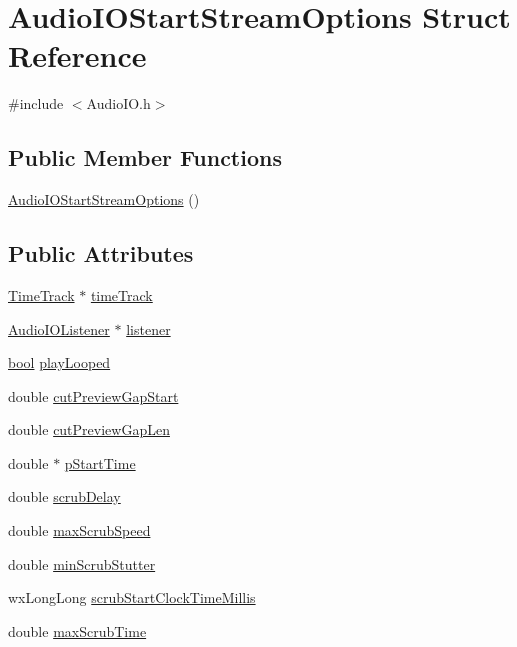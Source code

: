 \hypertarget{struct_audio_i_o_start_stream_options}{}\section{Audio\+I\+O\+Start\+Stream\+Options Struct Reference}
\label{struct_audio_i_o_start_stream_options}


{\ttfamily \#include $<$Audio\+I\+O.\+h$>$}

\subsection*{Public Member Functions}
\begin{DoxyCompactItemize}
\item 
\hyperlink{struct_audio_i_o_start_stream_options_a033ef570923e73da96f6e11c7f1b8647}{Audio\+I\+O\+Start\+Stream\+Options} ()
\end{DoxyCompactItemize}
\subsection*{Public Attributes}
\begin{DoxyCompactItemize}
\item 
\hyperlink{class_time_track}{Time\+Track} $\ast$ \hyperlink{struct_audio_i_o_start_stream_options_a3516f7c72546aa8a73fb25b2e628170f}{time\+Track}
\item 
\hyperlink{class_audio_i_o_listener}{Audio\+I\+O\+Listener} $\ast$ \hyperlink{struct_audio_i_o_start_stream_options_a326a9c07ece9c6b6ad8be00acc504dac}{listener}
\item 
\hyperlink{mac_2config_2i386_2lib-src_2libsoxr_2soxr-config_8h_abb452686968e48b67397da5f97445f5b}{bool} \hyperlink{struct_audio_i_o_start_stream_options_a51e6ebc52db021a9c18cdfa1e70c5ace}{play\+Looped}
\item 
double \hyperlink{struct_audio_i_o_start_stream_options_ae0b3e06a7234158e7f213302b71df8cb}{cut\+Preview\+Gap\+Start}
\item 
double \hyperlink{struct_audio_i_o_start_stream_options_a3a56b01ea4c98d7236134e36ff1dc8c1}{cut\+Preview\+Gap\+Len}
\item 
double $\ast$ \hyperlink{struct_audio_i_o_start_stream_options_a43d753f67299d5aa91402cf2a297536a}{p\+Start\+Time}
\item 
double \hyperlink{struct_audio_i_o_start_stream_options_aaea9d52a5df057012e6e9570670022be}{scrub\+Delay}
\item 
double \hyperlink{struct_audio_i_o_start_stream_options_ac44effeae42cfbcbef718f5737776082}{max\+Scrub\+Speed}
\item 
double \hyperlink{struct_audio_i_o_start_stream_options_a0f8bd5ad350f0a1739b173e9440fa0cd}{min\+Scrub\+Stutter}
\item 
wx\+Long\+Long \hyperlink{struct_audio_i_o_start_stream_options_a5df47acf7a90a322709000e4a2fc737a}{scrub\+Start\+Clock\+Time\+Millis}
\item 
double \hyperlink{struct_audio_i_o_start_stream_options_af3404830ea234ae73cf9a6a19b2f804c}{max\+Scrub\+Time}
\end{DoxyCompactItemize}



